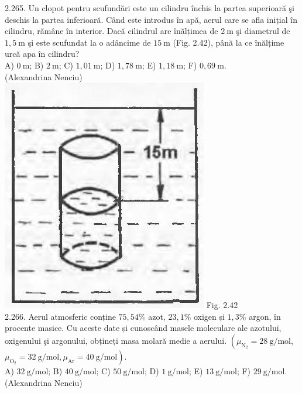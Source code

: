 \documentclass[10pt]{article}
\begin{document}
2.265. Un clopot pentru scufundări este un cilindru închis la partea superioară şi deschis la partea inferioară. Când este introdus în apă, aerul care se afla inițial în cilindru, rămâne în interior. Dacă cilindrul are înălțimea de $2 \mathrm{~m}$ şi diametrul de $1,5 \mathrm{~m}$ şi este scufundat la o adâncime de $15 \mathrm{~m}$ (Fig. 2.42), până la ce înălțime urcă apa în cilindru?\\ A) $0 \mathrm{~m}$; B) $2 \mathrm{~m}$; C) $1,01 \mathrm{~m}$; D) $1,78 \mathrm{~m}$; E) $1,18 \mathrm{~m}$; F) $0,69 \mathrm{~m}$.\\ (Alexandrina Nenciu)\\ \includegraphics[max width=\textwidth, center]{2025_07_01_5b3ff9fa0d508c8e9f17g-133} Fig. 2.42\\

2.266. Aerul atmosferic conține $75,54 \%$ azot, $23,1 \%$ oxigen și $1,3 \%$ argon, în procente masice. Cu aceste date și cunoscând masele moleculare ale azotului, oxigenului şi argonului, obțineți masa molară medie a aerului. $\left(\mu_{\mathrm{N}_{2}}=28 \mathrm{~g} / \mathrm{mol}\right.$, $\left.\mu_{\mathrm{O}_{2}}=32 \mathrm{~g} / \mathrm{mol}, \mu_{\mathrm{Ar}}=40 \mathrm{~g} / \mathrm{mol}\right)$.\\ A) $32 \mathrm{~g} / \mathrm{mol}$; B) $40 \mathrm{~g} / \mathrm{mol}$; C) $50 \mathrm{~g} / \mathrm{mol}$; D) $1 \mathrm{~g} / \mathrm{mol}$; E) $13 \mathrm{~g} / \mathrm{mol}$; F) $29 \mathrm{~g} / \mathrm{mol}$.\\ (Alexandrina Nenciu)\\
\end{document}

